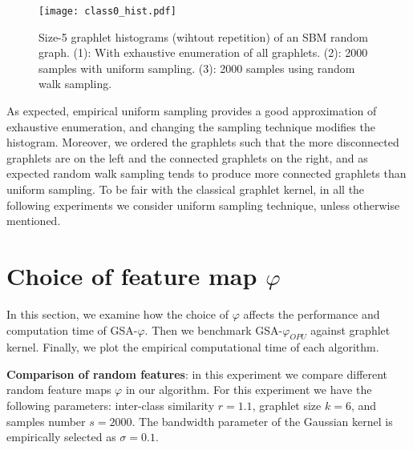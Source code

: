 \begin{figure}[H]
\centering
\texttt{[image: class0\_hist.pdf]}
\caption[Graphlet histograms of uniform and random walk sampling techniques]{Size-5 graphlet histograms (wihtout repetition) of an SBM random graph. (1): With exhaustive enumeration of all graphlets. (2): 2000 samples with uniform sampling. (3): 2000 samples using random walk sampling. }
\label{fig:graphlet_hist}
\end{figure}

As expected, empirical uniform sampling provides a good approximation of exhaustive enumeration, and changing the sampling technique modifies the histogram. Moreover, we ordered the graphlets such that the more disconnected graphlets are on the left and the connected graphlets on the right, and as expected random walk sampling tends to produce more connected graphlets than uniform sampling. To be fair with the classical graphlet kernel, in all the following experiments we consider uniform sampling technique, unless otherwise mentioned.
\section{Choice of feature map $\varphi$ }
\label{section:choice}
In this section, we examine how the choice of $\varphi$ affects the performance and computation time of GSA-$\varphi$. Then we benchmark GSA-$\varphi_{OPU}$ against graphlet kernel. Finally, we plot the empirical computational time of each algorithm. 

\textbf{Comparison of random features}: in this experiment we compare different random feature maps $\varphi$ in our algorithm. For this experiment we have the following parameters:  inter-class similarity $r=1.1$, graphlet size $k=6$, and samples number $s=2000$. The bandwidth parameter of the Gaussian kernel is empirically selected as $\sigma=0.1$.

